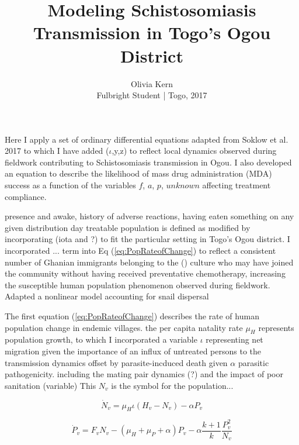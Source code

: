 \documentclass[12pt]{article}
\begin{document}
 

 
 
\title{Modeling Schistosomiasis Transmission in Togo's Ogou District}%
\author{Olivia Kern\\ %
Fulbright Student | Togo, 2017} %
 
\maketitle
 
Here I apply a set of ordinary differential equations adapted from Soklow et al. 2017 to which I have added ($\iota$,y,z) to reflect local dynamics observed during fieldwork contributing to Schistosomiasis transmission in Ogou. I also developed an equation to describe the likelihood of mass drug administration (MDA) success as a function of the variables $f$, $a$, $p$, $unknown$ affecting treatment compliance.

presence and awake, history of adverse reactions, having eaten something on any given distribution day 
treatable population is defined as modified by incorporating (iota and ?) to fit the particular setting in Togo's Ogou district. I incorporated ... term into Eq (\ref{eq:PopRateofChange})  to reflect a consistent number of Ghanian immigrants belonging to the () culture who may have joined the community without having received preventative chemotherapy, increasing the susceptible human population
phenomenon observed during fieldwork. 
Adapted a nonlinear model  accounting for snail dispersal


The first equation (\ref{eq:PopRateofChange}) describes the rate of human population change in endemic villages. the per capita natality rate $\mu_H$ represents population growth, to which I incorporated a variable $\iota$ representing net migration given the importance of an influx of untreated persons to the transmission dynamics
 offset by parasite-incduced death given $\alpha$ parasitic pathogenicity.
including the mating pair dynamics (?) and the impact of poor sanitation (variable)
This $N_v$ is the symbol for the population...

\begin{equation}\label{eq:PopRateofChange}
\dot{N}_v = \mu_H\iota(H_v - N_v) - \alpha P_v
\end{equation}
 
 \begin{equation}\label{eq:ParasiteRateofChange}
 \dot{P}_v = F_vN_v - (\mu_H + \mu_P + \alpha)P_v - \alpha \frac{k +1}{k} \frac{P_v^2}{N_v}
 \end{equation}
\end{document}
